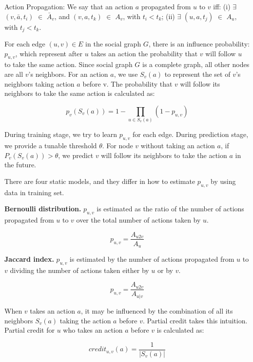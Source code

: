 \begin{definition}{Action Propagation:}
We say that an action $a$ propagated from $u$ to $v$ iff: (i) $\exists$ $(v, \bar{a}, t_i)$ $\in$ $\bar{A}_v$, 
and $(v, a, t_k)$ $\in$ $A_v$, with $t_i < t_k$; (ii) $\exists$ $(u, a, t_j)$ $\in$ $A_u$, with $t_j < t_k$. 
\end{definition}

For each edge $(u, v) \in E$ in the social graph $G$, 
there is an influence probability: $p_{u,v}$,
which represent after $u$ takes an action the probability that $v$ will follow $u$ to take the same action. 
Since social graph $G$ is a complete graph, 
all other nodes are all $v$'s neighbors. 
For an action $a$, we use $S_v(a)$ to represent the set of $v$'s neighbors taking action $a$ before v. 
The probability that $v$ will follow its neighbors to take the same action is calculated as:

\begin{equation} \label{eq:setp}
p_v(S_v(a)) = 1 - \prod\limits_{u \in S_v(a)}(1 - p_{u,v})
\end{equation}

During training stage, we try to learn $p_{u,v}$ for each edge. 
During prediction stage, we provide a tunable threshold $\theta$. 
For node $v$ without taking an action $a$, 
if $P_v(S_v(a))>\theta$, 
we predict $v$ will follow its neighbors to take the action $a$ in the future. 

There are four static models, and they differ in how to estimate $p_{u,v}$ by using data in training set. 


{\bf Bernoulli distribution.} $p_{u,v}$ is estimated as the ratio of the number of actions 
propagated from $u$ to $v$ over the total number of actions taken by $u$.

$$p_{u,v} = \frac{A_{u2v}}{A_u}$$ 

{\bf Jaccard index.} 
$p_{u,v}$ is estimated by the number of actions propagated from $u$ to $v$ dividing 
the number of actions taken either by $u$ or by $v$.

$$p_{u,v} = \frac{A_{u2v}}{A_{u|v}}$$ 

When $v$ takes an action $a$, it may be influenced by the combination of all its neighbors $S_v(a)$ 
taking the action $a$ before $v$. Partial credit takes this intuition. 
Partial credit for $u$ who takes an action $a$ before $v$ is calculated as:

$$credit_{u,v}(a) = \frac{1}{|S_v(a)|}$$

